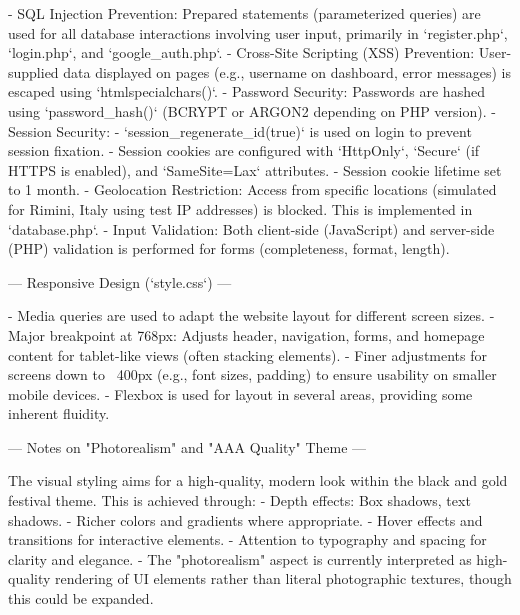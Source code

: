 - SQL Injection Prevention: Prepared statements (parameterized queries) are used for all database interactions involving user input, primarily in `register.php`, `login.php`, and `google_auth.php`.
- Cross-Site Scripting (XSS) Prevention: User-supplied data displayed on pages (e.g., username on dashboard, error messages) is escaped using `htmlspecialchars()`.
- Password Security: Passwords are hashed using `password_hash()` (BCRYPT or ARGON2 depending on PHP version).
- Session Security:
    - `session_regenerate_id(true)` is used on login to prevent session fixation.
    - Session cookies are configured with `HttpOnly`, `Secure` (if HTTPS is enabled), and `SameSite=Lax` attributes.
    - Session cookie lifetime set to 1 month.
- Geolocation Restriction: Access from specific locations (simulated for Rimini, Italy using test IP addresses) is blocked. This is implemented in `database.php`.
- Input Validation: Both client-side (JavaScript) and server-side (PHP) validation is performed for forms (completeness, format, length).

--- Responsive Design (`style.css`) ---

- Media queries are used to adapt the website layout for different screen sizes.
- Major breakpoint at 768px: Adjusts header, navigation, forms, and homepage content for tablet-like views (often stacking elements).
- Finer adjustments for screens down to ~400px (e.g., font sizes, padding) to ensure usability on smaller mobile devices.
- Flexbox is used for layout in several areas, providing some inherent fluidity.

--- Notes on "Photorealism" and "AAA Quality" Theme ---

The visual styling aims for a high-quality, modern look within the black and gold festival theme. This is achieved through:
- Depth effects: Box shadows, text shadows.
- Richer colors and gradients where appropriate.
- Hover effects and transitions for interactive elements.
- Attention to typography and spacing for clarity and elegance.
- The "photorealism" aspect is currently interpreted as high-quality rendering of UI elements rather than literal photographic textures, though this could be expanded.
